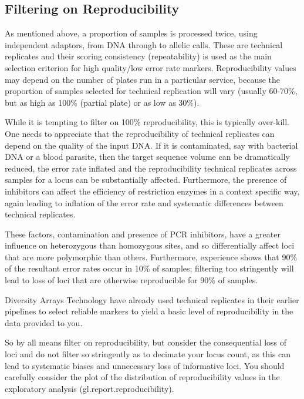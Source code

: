 \documentclass[
  letterpaper,
  DIV=11,
  numbers=noendperiod]{scrreprt}
\begin{document}
\hypertarget{filtering-on-reproducibility-1}{%
\subsection*{Filtering on
Reproducibility}\label{filtering-on-reproducibility-1}}

As mentioned above, a proportion of samples is processed twice, using
independent adaptors, from DNA through to allelic calls. These are
technical replicates and their scoring consistency (repeatability) is
used as the main selection criterion for high quality/low error rate
markers. Reproducibility values may depend on the number of plates run
in a particular service, because the proportion of samples selected for
technical replication will vary (usually 60-70\%, but as high as 100\%
(partial plate) or as low as 30\%).

While it is tempting to filter on 100\% reproducibility, this is
typically over-kill. One needs to appreciate that the reproducibility of
technical replicates can depend on the quality of the input DNA. If it
is contaminated, say with bacterial DNA or a blood parasite, then the
target sequence volume can be dramatically reduced, the error rate
inflated and the reproducibility technical replicates across samples for
a locus can be substantially affected. Furthermore, the presence of
inhibitors can affect the efficiency of restriction enzymes in a context
specific way, again leading to inflation of the error rate and
systematic differences between technical replicates.

These factors, contamination and presence of PCR inhibitors, have a
greater influence on heterozygous than homozygous sites, and so
differentially affect loci that are more polymorphic than others.
Furthermore, experience shows that 90\% of the resultant error rates
occur in 10\% of samples; filtering too stringently will lead to loss of
loci that are otherwise reproducible for 90\% of samples.

Diversity Arrays Technology have already used technical replicates in
their earlier pipelines to select reliable markers to yield a basic
level of reproducibility in the data provided to you.

So by all means filter on reproducibility, but consider the
consequential loss of loci and do not filter so stringently as to
decimate your locus count, as this can lead to systematic biases and
unnecessary loss of informative loci. You should carefully consider the
plot of the distribution of reproducibility values in the exploratory
analysis (gl.report.reproducibility).
\end{document}
